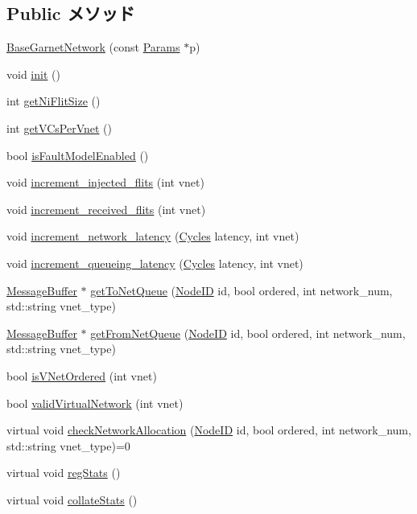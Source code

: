 \subsection*{Public メソッド}
\begin{DoxyCompactItemize}
\item 
\hyperlink{classBaseGarnetNetwork_a20ea3960928fe0defff95bb03efc435f}{BaseGarnetNetwork} (const \hyperlink{classBaseGarnetNetwork_a9b387eae2084a167c00ec5550159a245}{Params} $\ast$p)
\item 
void \hyperlink{classBaseGarnetNetwork_a02fd73d861ef2e4aabb38c0c9ff82947}{init} ()
\item 
int \hyperlink{classBaseGarnetNetwork_a78fde0f587d4c7fd379f85526a09a952}{getNiFlitSize} ()
\item 
int \hyperlink{classBaseGarnetNetwork_a08e15022aa1b80764b8f355c5bfe01f9}{getVCsPerVnet} ()
\item 
bool \hyperlink{classBaseGarnetNetwork_a1dc6b2b6c8275ad36b74beff43e89390}{isFaultModelEnabled} ()
\item 
void \hyperlink{classBaseGarnetNetwork_a0bc8941f77cccd0dfbf786e6a09c8861}{increment\_\-injected\_\-flits} (int vnet)
\item 
void \hyperlink{classBaseGarnetNetwork_a2afd334f1237424acf847d5ddb7a2a95}{increment\_\-received\_\-flits} (int vnet)
\item 
void \hyperlink{classBaseGarnetNetwork_a5fce9a1760010c8fdd6f09dea941b8ee}{increment\_\-network\_\-latency} (\hyperlink{classCycles}{Cycles} latency, int vnet)
\item 
void \hyperlink{classBaseGarnetNetwork_a9ecb65d46da0a615d77f2cbffe203304}{increment\_\-queueing\_\-latency} (\hyperlink{classCycles}{Cycles} latency, int vnet)
\item 
\hyperlink{classMessageBuffer}{MessageBuffer} $\ast$ \hyperlink{classBaseGarnetNetwork_a19d1e55629eb66ec0e248558198f327a}{getToNetQueue} (\hyperlink{TypeDefines_8hh_a83c14b4ae37e80071f6b3506a6c46151}{NodeID} id, bool ordered, int network\_\-num, std::string vnet\_\-type)
\item 
\hyperlink{classMessageBuffer}{MessageBuffer} $\ast$ \hyperlink{classBaseGarnetNetwork_a95cf297000502b35bd0666d6b034b9bf}{getFromNetQueue} (\hyperlink{TypeDefines_8hh_a83c14b4ae37e80071f6b3506a6c46151}{NodeID} id, bool ordered, int network\_\-num, std::string vnet\_\-type)
\item 
bool \hyperlink{classBaseGarnetNetwork_a52d31485b47857b8e7eb4a89efdf56a6}{isVNetOrdered} (int vnet)
\item 
bool \hyperlink{classBaseGarnetNetwork_adf94d17da461ce5960923fec76cf70b5}{validVirtualNetwork} (int vnet)
\item 
virtual void \hyperlink{classBaseGarnetNetwork_a17adbaf838763d6fd04e9dbf53536b15}{checkNetworkAllocation} (\hyperlink{TypeDefines_8hh_a83c14b4ae37e80071f6b3506a6c46151}{NodeID} id, bool ordered, int network\_\-num, std::string vnet\_\-type)=0
\item 
virtual void \hyperlink{classBaseGarnetNetwork_a4dc637449366fcdfc4e764cdf12d9b11}{regStats} ()
\item 
virtual void \hyperlink{classBaseGarnetNetwork_ae3089fd60541650eefd9605c2c1abc68}{collateStats} ()
\end{DoxyCompactItemize}
